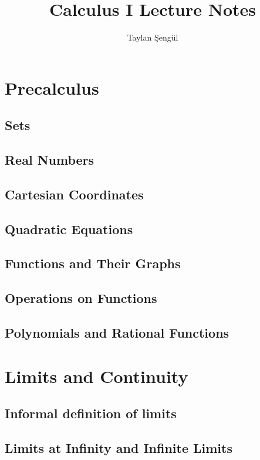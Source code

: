 \documentclass[12pt]{memoir}
\title{Calculus I Lecture Notes}
\author{Taylan Şengül}
\begin{document}
\maketitle
\tableofcontents
\chapter{Precalculus}
    \section{Sets}
    
    \section{Real Numbers}
    
    \section{Cartesian Coordinates}
    
    \section{Quadratic Equations}
    
    \section{Functions and Their Graphs}
    
    \section{Operations on Functions}
    
    \section{Polynomials and Rational Functions}
    


\chapter{Limits and Continuity}
    \section{Informal definition of limits}
    
    \section{Limits at Infinity and Infinite Limits}
    
\end{document}
